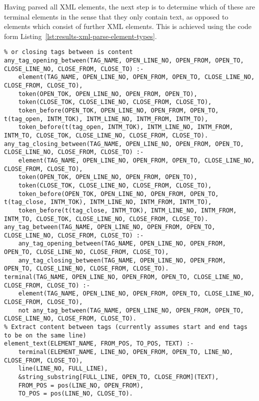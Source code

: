 Having parsed all XML elements, the next step is to determine which of these are terminal elements in the sense that they only contain text, as opposed to elements which consist of further XML elements. This is achieved using the code form Listing~\ref{lst:results-xml-parse-element-types}.

\begin{lstlisting}[style=asp-code, label={lst:results-xml-parse-element-types}, caption={Parsing details of XML elements}]
% Any string between two tags with no other opening 
% or closing tags between is content
any_tag_opening_between(TAG_NAME, OPEN_LINE_NO, OPEN_FROM, OPEN_TO, CLOSE_LINE_NO, CLOSE_FROM, CLOSE_TO) :- 
	element(TAG_NAME, OPEN_LINE_NO, OPEN_FROM, OPEN_TO, CLOSE_LINE_NO, CLOSE_FROM, CLOSE_TO),
	token(OPEN_TOK, OPEN_LINE_NO, OPEN_FROM, OPEN_TO),
	token(CLOSE_TOK, CLOSE_LINE_NO, CLOSE_FROM, CLOSE_TO),
	token_before(OPEN_TOK, OPEN_LINE_NO, OPEN_FROM, OPEN_TO, t(tag_open, INTM_TOK), INTM_LINE_NO, INTM_FROM, INTM_TO),
	token_before(t(tag_open, INTM_TOK), INTM_LINE_NO, INTM_FROM, INTM_TO, CLOSE_TOK, CLOSE_LINE_NO, CLOSE_FROM, CLOSE_TO).
any_tag_closing_between(TAG_NAME, OPEN_LINE_NO, OPEN_FROM, OPEN_TO, CLOSE_LINE_NO, CLOSE_FROM, CLOSE_TO) :- 
	element(TAG_NAME, OPEN_LINE_NO, OPEN_FROM, OPEN_TO, CLOSE_LINE_NO, CLOSE_FROM, CLOSE_TO),
	token(OPEN_TOK, OPEN_LINE_NO, OPEN_FROM, OPEN_TO),
	token(CLOSE_TOK, CLOSE_LINE_NO, CLOSE_FROM, CLOSE_TO),
	token_before(OPEN_TOK, OPEN_LINE_NO, OPEN_FROM, OPEN_TO, t(tag_close, INTM_TOK), INTM_LINE_NO, INTM_FROM, INTM_TO),
	token_before(t(tag_close, INTM_TOK), INTM_LINE_NO, INTM_FROM, INTM_TO, CLOSE_TOK, CLOSE_LINE_NO, CLOSE_FROM, CLOSE_TO). 
any_tag_between(TAG_NAME, OPEN_LINE_NO, OPEN_FROM, OPEN_TO, CLOSE_LINE_NO, CLOSE_FROM, CLOSE_TO) :-
	any_tag_opening_between(TAG_NAME, OPEN_LINE_NO, OPEN_FROM, OPEN_TO, CLOSE_LINE_NO, CLOSE_FROM, CLOSE_TO),
	any_tag_closing_between(TAG_NAME, OPEN_LINE_NO, OPEN_FROM, OPEN_TO, CLOSE_LINE_NO, CLOSE_FROM, CLOSE_TO).       
terminal(TAG_NAME, OPEN_LINE_NO, OPEN_FROM, OPEN_TO, CLOSE_LINE_NO, CLOSE_FROM, CLOSE_TO) :- 
	element(TAG_NAME, OPEN_LINE_NO, OPEN_FROM, OPEN_TO, CLOSE_LINE_NO, CLOSE_FROM, CLOSE_TO),
	not any_tag_between(TAG_NAME, OPEN_LINE_NO, OPEN_FROM, OPEN_TO, CLOSE_LINE_NO, CLOSE_FROM, CLOSE_TO).
% Extract content between tags (currently assumes start and end tags to be on the same line)
element_text(ELEMENT_NAME, FROM_POS, TO_POS, TEXT) :-
	terminal(ELEMENT_NAME, LINE_NO, OPEN_FROM, OPEN_TO, LINE_NO, CLOSE_FROM, CLOSE_TO),
	line(LINE_NO, FULL_LINE),
	&string_substring[FULL_LINE, OPEN_TO, CLOSE_FROM](TEXT),
	FROM_POS = pos(LINE_NO, OPEN_FROM),
	TO_POS = pos(LINE_NO, CLOSE_TO).
\end{lstlisting} 

